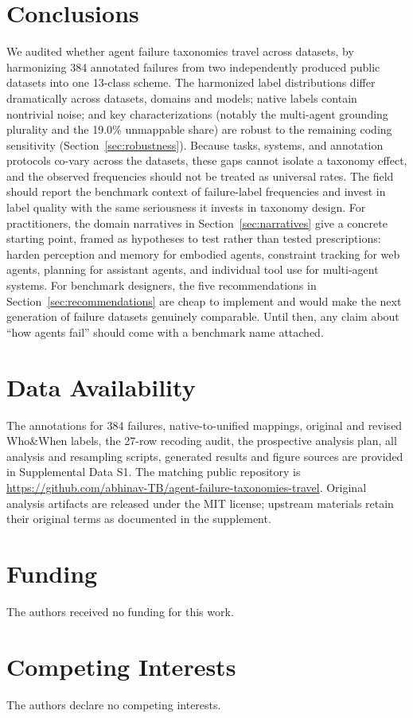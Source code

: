 \documentclass[12pt,letterpaper]{article}
\begin{document}
\section{Conclusions}
We audited whether agent failure taxonomies travel across datasets, by
harmonizing 384 annotated failures from two independently produced public
datasets into one 13-class scheme. The harmonized label distributions differ
dramatically across datasets, domains and models; native labels contain
nontrivial noise; and key characterizations (notably the multi-agent
grounding plurality and the 19.0\% unmappable share) are robust to the remaining coding sensitivity (Section~\ref{sec:robustness}). Because
tasks, systems, and annotation protocols co-vary across the datasets, these
gaps cannot isolate a taxonomy effect, and the observed frequencies should not be treated as universal rates. The field should report the benchmark context of failure-label frequencies
and invest in label quality with the same seriousness it invests in taxonomy
design. For practitioners, the domain narratives in Section~\ref{sec:narratives} give a
concrete starting point, framed as hypotheses to test rather than tested
prescriptions: harden perception and memory for embodied agents, constraint
tracking for web agents, planning for assistant agents, and individual tool
use for multi-agent systems. For benchmark designers,
the five recommendations in Section~\ref{sec:recommendations} are cheap to implement and would make
the next generation of failure datasets genuinely comparable. Until then,
any claim about ``how agents fail'' should come with a benchmark name
attached.

\section{Data Availability}
The annotations for 384 failures, native-to-unified mappings, original and
revised Who\&When labels, the 27-row recoding audit, the prospective analysis
plan, all analysis and resampling scripts, generated results and figure
sources are provided in Supplemental Data S1. The matching public repository
is \url{https://github.com/abhinav-TB/agent-failure-taxonomies-travel}.
Original analysis artifacts are released under the MIT license; upstream
materials retain their original terms as documented in the supplement.

\section*{Funding}
The authors received no funding for this work.

\section*{Competing Interests}
The authors declare no competing interests.

\FloatBarrier
\printbibliography
\end{document}
